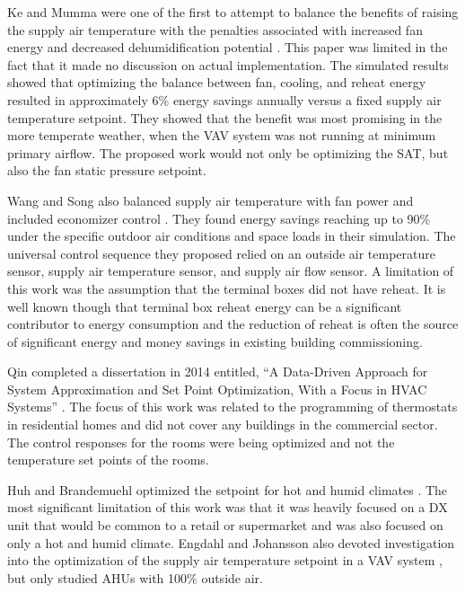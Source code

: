 Ke and Mumma were one of the first to attempt to balance the benefits of raising the supply air temperature with the penalties associated with increased fan energy and decreased dehumidification potential \cite{Ke1997OptimizedSystems}. This paper was limited in the fact that it made no discussion on actual implementation. The simulated results showed that optimizing the balance between fan, cooling, and reheat energy resulted in approximately 6\% energy savings annually versus a fixed supply air temperature setpoint. They showed that the benefit was most promising in the more temperate weather, when the VAV system was not running at minimum primary airflow. The proposed work would not only be optimizing the SAT, but also the fan static pressure setpoint.   

Wang and Song also balanced supply air temperature with fan power and included economizer control \cite{Wang2012AirCycles}. They found energy savings reaching up to 90\% under the specific outdoor air conditions and space loads in their simulation. The universal control sequence they proposed relied on an outside air temperature sensor, supply air temperature sensor, and supply air flow sensor. A limitation of this work was the assumption that the terminal boxes did not have reheat. It is well known though that terminal box reheat energy can be a significant contributor to energy consumption and the reduction of reheat is often the source of significant energy and money savings in existing building commissioning.  

Qin completed a dissertation in 2014 entitled, ``A Data-Driven Approach for System Approximation and Set Point Optimization, With a Focus in HVAC Systems'' \cite{Qin_2014_Res_Letters}. The focus of this work was related to the programming of thermostats in residential homes and did not cover any buildings in the commercial sector. The control responses for the rooms were being optimized and not the temperature set points of the rooms.  

Huh and Brandemuehl optimized the setpoint for hot and humid climates \cite{Huh2008}. The most significant limitation of this work was that it was heavily focused on a DX unit that would be common to a retail or supermarket and was also focused on only a hot and humid climate. Engdahl and Johansson also devoted investigation into the optimization of the supply air temperature setpoint in a VAV system \cite{Engdahl2004}, but only studied AHUs with 100\% outside air. 

